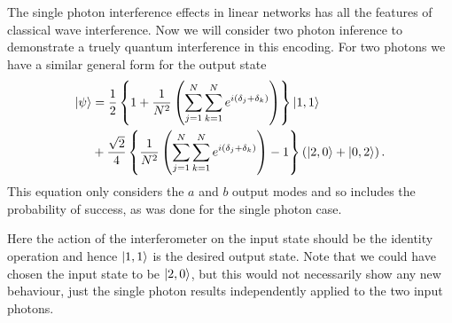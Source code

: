 \documentclass[aps,pra,twocolumn,superscriptaddress,numerical,floatfix]{revtex4-1}
\begin{document}
The single photon interference effects in linear networks has all the features of classical wave interference.  Now we will consider two photon inference to demonstrate a truely quantum interference in this encoding.  For two photons we have a similar general form for the output state 
\begin{align}
	\left|\psi\right\rangle & =  \frac{1}{2}\left\{ 1+\frac{1}{N^{2}}\left(\sum_{j=1}^{N}\sum_{k=1}^{N}e^{i(\delta_{j}+\delta_{k})}\right)\right\} \ket{1,1} \nonumber\\
	& +\frac{\sqrt{2}}{4}\left\{ \frac{1}{N^{2}}\left(\sum_{j=1}^{N}\sum_{k=1}^{N}e^{i(\delta_{j}+\delta_{k})}\right)-1\right\} \left(\ket{2,0} +\ket{0,2}\right).\label{eq:2pNarbitrary S}
\end{align}
This equation only considers the $a$ and $b$ output modes and so includes the probability of success, as was done for the single photon case.

Here the action of the interferometer on the input state should be the identity operation and hence $\ket{1,1}$ is the desired output state.   Note that we could have chosen the input state to be $\ket{2,0}$, but this would not necessarily show any new behaviour, just the single photon results independently applied to the two input photons. 
\end{document}
